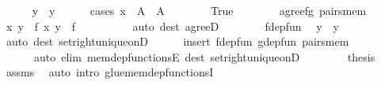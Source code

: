 \begin{isabellebody}
\ \ \ \ \isamarkupfalse%
\ {\isachardoublequoteopen}y\ {\isacharequal}{\kern0pt}\ y{\isacharprime}{\kern0pt}{\isachardoublequoteclose}\isanewline
\ \ \ \ \isamarkupfalse%
\ {\isacharparenleft}{\kern0pt}cases\ {\isachardoublequoteopen}x\ {\isasymin}\ A\ {\isasyminter}\ A{\isacharprime}{\kern0pt}{\isachardoublequoteclose}{\isacharparenright}{\kern0pt}\isanewline
\ \ \ \ \ \ \isamarkupfalse%
\ True\isanewline
\ \ \ \ \ \ \isamarkupfalse%
\ agree{\isacharunderscore}{\kern0pt}fg\ pairs{\isacharunderscore}{\kern0pt}mem\ \isamarkupfalse%
\ {\isachardoublequoteopen}{\isasymlangle}x{\isacharcomma}{\kern0pt}\ y{\isasymrangle}\ {\isasymin}\ f{\isachardoublequoteclose}\ {\isachardoublequoteopen}{\isasymlangle}x{\isacharcomma}{\kern0pt}\ y{\isacharprime}{\kern0pt}{\isasymrangle}\ {\isasymin}\ f{\isachardoublequoteclose}\isanewline
\ \ \ \ \ \ \ \ \isamarkupfalse%
\ {\isacharparenleft}{\kern0pt}auto\ dest{\isacharcolon}{\kern0pt}\ agreeD{\isacharparenright}{\kern0pt}\isanewline
\ \ \ \ \ \ \isamarkupfalse%
\ f{\isacharunderscore}{\kern0pt}dep{\isacharunderscore}{\kern0pt}fun\ \isamarkupfalse%
\ {\isachardoublequoteopen}y\ {\isacharequal}{\kern0pt}\ y{\isacharprime}{\kern0pt}{\isachardoublequoteclose}\ \isamarkupfalse%
\ {\isacharparenleft}{\kern0pt}auto\ dest{\isacharcolon}{\kern0pt}\ set{\isacharunderscore}{\kern0pt}right{\isacharunderscore}{\kern0pt}unique{\isacharunderscore}{\kern0pt}onD{\isacharparenright}{\kern0pt}\isanewline
\ \ \ \ \isamarkupfalse%
\ {\isacharparenleft}{\kern0pt}insert\ f{\isacharunderscore}{\kern0pt}dep{\isacharunderscore}{\kern0pt}fun\ g{\isacharunderscore}{\kern0pt}dep{\isacharunderscore}{\kern0pt}fun\ pairs{\isacharunderscore}{\kern0pt}mem{\isacharcomma}{\kern0pt}\isanewline
\ \ \ \ \ \ auto\ elim{\isacharbang}{\kern0pt}{\isacharcolon}{\kern0pt}\ mem{\isacharunderscore}{\kern0pt}dep{\isacharunderscore}{\kern0pt}functionsE\ dest{\isacharcolon}{\kern0pt}\ set{\isacharunderscore}{\kern0pt}right{\isacharunderscore}{\kern0pt}unique{\isacharunderscore}{\kern0pt}onD{\isacharparenright}{\kern0pt}\isanewline
\ \ \isamarkupfalse%
\isanewline
\ \ \isamarkupfalse%
\ \isamarkupfalse%
\ {\isacharquery}{\kern0pt}thesis\ \isamarkupfalse%
\ assms\ \isamarkupfalse%
\ {\isacharparenleft}{\kern0pt}auto\ intro{\isacharcolon}{\kern0pt}\ glue{\isacharunderscore}{\kern0pt}mem{\isacharunderscore}{\kern0pt}dep{\isacharunderscore}{\kern0pt}functionsI{\isacharparenright}{\kern0pt}\isanewline

\end{isabellebody}
